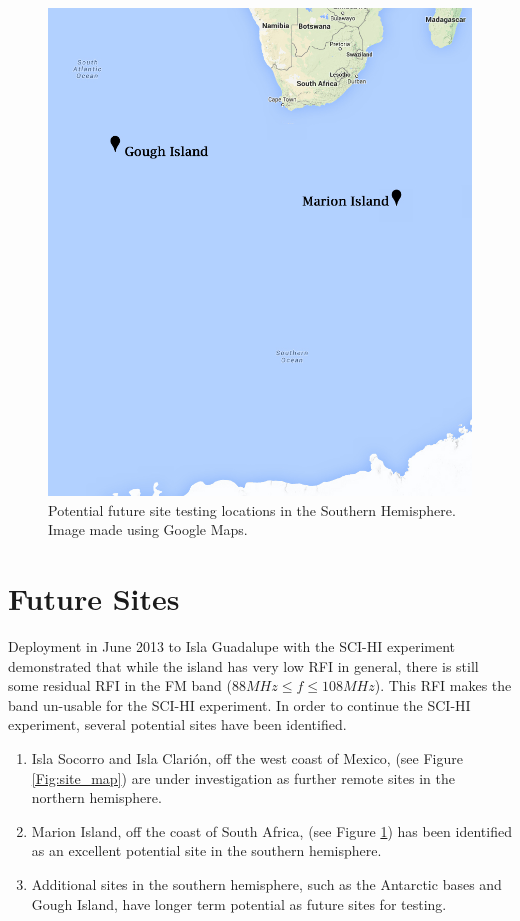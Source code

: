 \begin{figure}[htb]
\begin{center}
\includegraphics[width=0.8\linewidth]{RFI_testing/figures/site_testing_south.jpg}
\caption{Potential future site testing locations in the Southern Hemisphere. Image made using Google Maps.}
\label{Fig:site_map_south}
\end{center}
\end{figure}



\section{Future Sites}

Deployment in June 2013 to Isla Guadalupe with the SCI-HI experiment demonstrated that while the island has very low RFI in general, there is still some residual RFI in the FM band ($88 MHz \leq f \leq 108 MHz$). This RFI makes the band un-usable for the SCI-HI experiment. In order to continue the SCI-HI experiment, several potential sites have been identified.

\begin{enumerate}

\item Isla Socorro and Isla Clari\'{o}n, off the west coast of Mexico, (see Figure \ref{Fig:site_map}) are under investigation as further remote sites in the northern hemisphere.

\item Marion Island, off the coast of South Africa, (see Figure \ref{Fig:site_map_south}) has been identified as an excellent potential site in the southern hemisphere.

\item Additional sites in the southern hemisphere, such as the Antarctic bases and Gough Island, have longer term potential as future sites for testing. 

\end{enumerate}

